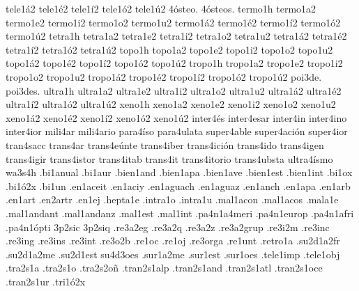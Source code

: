{tele1á2 tele1é2 tele1í2 tele1ó2 tele1ú2
4ósteo.
4ósteos.
termo1h
termo1a2 termo1e2 termo1i2 termo1o2 termo1u2
termo1á2 termo1é2 termo1í2 termo1ó2 termo1ú2
tetra1h
tetra1a2 tetra1e2 tetra1i2 tetra1o2 tetra1u2
tetra1á2 tetra1é2 tetra1í2 tetra1ó2 tetra1ú2
topo1h
topo1a2 topo1e2 topo1i2 topo1o2 topo1u2
topo1á2 topo1é2 topo1í2 topo1ó2 topo1ú2
tropo1h
tropo1a2 tropo1e2 tropo1i2 tropo1o2 tropo1u2
tropo1á2 tropo1é2 tropo1í2 tropo1ó2 tropo1ú2
poi3de.
poi3des.
ultra1h
ultra1a2 ultra1e2 ultra1i2 ultra1o2 ultra1u2
ultra1á2 ultra1é2 ultra1í2 ultra1ó2 ultra1ú2
xeno1h
xeno1a2 xeno1e2 xeno1i2 xeno1o2 xeno1u2
xeno1á2 xeno1é2 xeno1í2 xeno1ó2 xeno1ú2
inter4és
inter4esar
inter4in
inter4ino
inter4ior
mili4ar
mili4ario
para4íso
para4ulata
super4able
super4ación
super4ior
tran4sacc
trans4ar
trans4eúnte
trans4iber
trans4ición
trans4ido
trans4igen
trans4igir
trans4istor
trans4itab
trans4it
trans4itorio
trans4ubsta
ultra4ísmo
wa3s4h
.bi1anual
.bi1aur
.bien1and
.bien1apa
.bien1ave
.bien1est
.bien1int
.bi1ox
.bi1ó2x
.bi1un
.en1aceit
.en1aciy
.en1aguach
.en1aguaz
.en1anch
.en1apa
.en1arb
.en1art
.en2artr
.en1ej
.hepta1e
.intra1o
.intra1u
.mal1acon
.mal1acos
.mala1e
.mal1andant
.mal1andanz
.mal1est
.mal1int
.pa4n1a4meri
.pa4n1europ
.pa4n1afri
.pa4n1ópti
3p2sic
3p2siq
.re3a2eg
.re3a2q
.re3a2z
.re3a2grup
.re3i2m
.re3inc
.re3ing
.re3ins
.re3int
.re3o2b
.re1oc
.re1oj
.re3orga
.re1unt
.retro1a
.su2d1a2fr
.su2d1a2me
.su2d1est
su4d3oes
.sur1a2me
.sur1est
.sur1oes
.tele1imp
.tele1obj
.tra2s1a
.tra2s1o
.tra2s2oñ
.tran2s1alp
.tran2s1and
.tran2s1atl
.tran2s1oce
.tran2s1ur
.tri1ó2x
}

